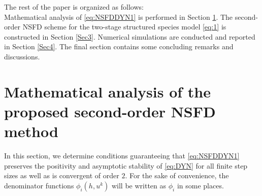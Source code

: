 \documentclass[12pt]{article}
\theoremstyle{definition}
\theoremstyle{remark}
\numberwithin{equation}{section}
\begin{document}
The rest of the paper is organized as follows:\\
Mathematical analysis of \eqref{eq:NSFDDYN1} is performed in Section \ref{Sec2}. The second-order NSFD scheme for the two-stage structured species model \eqref{eq:1} is constructed in Section \ref{Sec3}. Numerical simulations are conducted and reported in Section \ref{Sec4}. The final section contains some concluding remarks and discussions.
\section{Mathematical analysis of the proposed second-order NSFD method}\label{Sec2}
In this section, we determine conditions guaranteeing that \eqref{eq:NSFDDYN1} preserves the positivity and asymptotic stability of \eqref{eq:DYN} for all finite step sizes as well as is convergent of order $2$. For the sake of convenience, the denominator functions $\phi_i(h, u^k)$ will be written as $\phi_i$ in some places.
\end{document}
